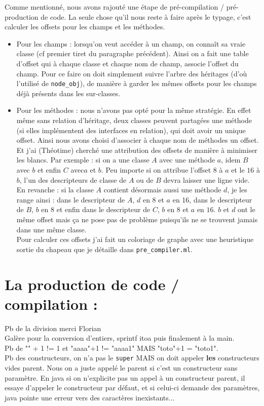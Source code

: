 \documentclass[12pt,a4paper]{report}
\begin{document}
\vspace{0.8cm}
\noindent Comme mentionné, nous avons rajouté une étape de pré-compilation / pré-production de code. La seule chose qu'il nous reste à faire après le typage, c'est calculer les offsets pour les champs et les méthodes.
\begin{itemize}
\item Pour les champs : lorsqu'on veut accéder à un champ, on connaît sa vraie classe (cf premier tiret du paragraphe précédent). Ainsi on a fait une table d'offset qui à chaque classe et chaque nom de champ, associe l'offset du champ. Pour ce faire on doit simplement suivre l'arbre des héritages (d'où l'utilisé de \texttt{node\_obj}), de manière à garder les mêmes offsets pour les champs déjà présents dans les sur-classes. 
\item Pour les méthodes : nous n'avons pas opté pour la même stratégie. En effet même sans relation d'héritage, deux classes peuvent partagées une méthode (si elles implémentent des interfaces en relation), qui doit avoir un unique offset. Ainsi nous avons choisi d'associer à chaque nom de méthodes un offset. Et j'ai (Théotime) cherché une attribution des offsets de manière à minimiser les blancs. Par exemple : si on a une classe $A$ avec une méthode $a$, idem $B$ avec $b$ et enfin $C$ avec$a$ et $b$. Peu importe si on attribue l'offset $8$ à $a$ et le $16$ à $b$, l'un des descripteurs de classe de $A$ ou de $B$ devra laisser une ligne vide. En revanche : si la classe $A$ contient désormais aussi une méthode $d$, je les range ainsi : dans le descripteur de $A$, $d$ en $8$ et $a$ en 16, dans le descripteur de $B$, $b$ en $8$ et enfin dans le descripteur de $C$, $b$ en $8$ et $a$ en $16$. $b$ et $d$ ont le même offset mais ça ne pose pas de problème puisqu'ils ne se trouvent jamais dans une même classe. \\
Pour calculer ces offsets j'ai fait un coloriage de graphe avec une heuristique sortie du chapeau que je détaille dans \texttt{pre\_compiler.ml}.
\end{itemize}

\section{La production de code / compilation :}
Pb de la division merci Florian\\
Galère pour la conversion d'entiers, sprintf itoa puis finalement à la main. \\
Pb de "" + 1 != 1 et "aaaa"+1 != "aaaa1" MAIS "toto"+1 = "toto1". \\
Pb des constructeurs, on n'a pas le \texttt{super} MAIS on doit appeler \textbf{les} constructeurs vides parent. Nous on a juste appelé le parent si c'est un constructeur sans paramètre. En java si on n'explicite pas un appel à un constructeur parent, il essaye d'appeler le constructeur par défaut, et si celui-ci demande des paramètres, java pointe une erreur vers des caractères inexistants... 
\end{document}
